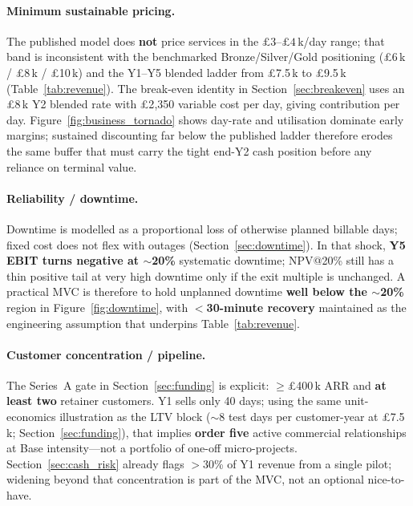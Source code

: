 \paragraph{Minimum sustainable pricing.}
The published model does \textbf{not} price services in the
$\pounds3$--$\pounds4$\,k/day range; that band is inconsistent with the
benchmarked Bronze/Silver/Gold positioning (\pounds6\,k / \pounds8\,k /
\pounds10\,k) and the Y1--Y5 blended ladder from \pounds7.5\,k to
\pounds9.5\,k (Table~\ref{tab:revenue}). The break-even identity in
Section~\ref{sec:breakeven} uses an \pounds8\,k Y2 blended rate with
\pounds2{,}350 variable cost per day, giving \contributionMargin{} contribution
per day. Figure~\ref{fig:business_tornado} shows day-rate and utilisation
dominate early margins; sustained discounting far below the published ladder
therefore erodes the same buffer that must carry the tight end-Y2 cash
position before any reliance on terminal value.

\paragraph{Reliability / downtime.}
Downtime is modelled as a proportional loss of otherwise planned billable days;
fixed cost does not flex with outages (Section~\ref{sec:downtime}). In that
shock, \textbf{Y5 EBIT turns negative at $\sim$20\%} systematic downtime;
NPV@20\% still has a thin positive tail at very high downtime only if the exit
multiple is unchanged. A practical MVC is therefore to hold unplanned downtime
\textbf{well below the $\sim$20\%} region in Figure~\ref{fig:downtime}, with
\textbf{$<$30-minute recovery} maintained as the engineering assumption that
underpins Table~\ref{tab:revenue}.

\paragraph{Customer concentration / pipeline.}
The Series~A gate in Section~\ref{sec:funding} is explicit:
$\geq$\pounds400\,k ARR and \textbf{at least two} retainer customers. Y1 sells
only 40 days; using the same unit-economics illustration as the LTV block
($\sim$8 test days per customer-year at \pounds7.5\,k;
Section~\ref{sec:funding}), that implies \textbf{order five} active commercial
relationships at Base intensity---not a portfolio of one-off micro-projects.
Section~\ref{sec:cash_risk} already flags $>$30\% of Y1 revenue from a single
pilot; widening beyond that concentration is part of the MVC, not an optional
nice-to-have.

